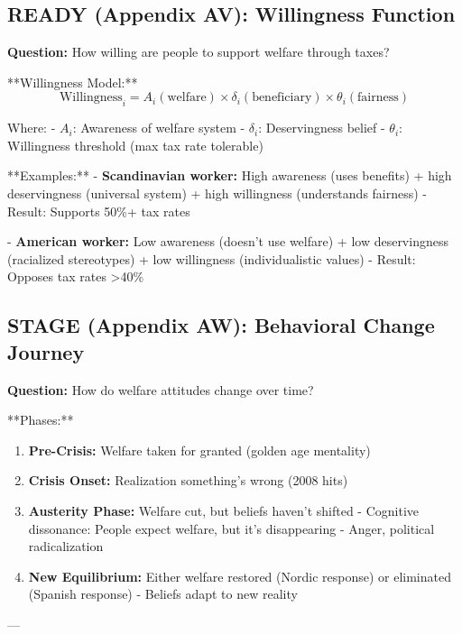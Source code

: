 \subsection{READY (Appendix AV): Willingness Function}

\textbf{Question:} How willing are people to support welfare through taxes?

**Willingness Model:**
\begin{equation}
\text{Willingness}_i = A_i(\text{welfare}) \times \delta_i(\text{beneficiary}) \times \theta_i(\text{fairness})
\end{equation}

Where:
- $A_i$: Awareness of welfare system
- $\delta_i$: Deservingness belief
- $\theta_i$: Willingness threshold (max tax rate tolerable)

**Examples:**
- \textbf{Scandinavian worker:} High awareness (uses benefits) + high deservingness (universal system) + high willingness (understands fairness)
   - Result: Supports 50\%+ tax rates

- \textbf{American worker:} Low awareness (doesn't use welfare) + low deservingness (racialized stereotypes) + low willingness (individualistic values)
   - Result: Opposes tax rates >40\%

\subsection{STAGE (Appendix AW): Behavioral Change Journey}

\textbf{Question:} How do welfare attitudes change over time?

**Phases:**
\begin{enumerate}
\item \textbf{Pre-Crisis:} Welfare taken for granted (golden age mentality)
\item \textbf{Crisis Onset:} Realization something's wrong (2008 hits)
\item \textbf{Austerity Phase:} Welfare cut, but beliefs haven't shifted
   - Cognitive dissonance: People expect welfare, but it's disappearing
   - Anger, political radicalization
\item \textbf{New Equilibrium:} Either welfare restored (Nordic response) or eliminated (Spanish response)
   - Beliefs adapt to new reality
\end{enumerate}

---

\clearpage


